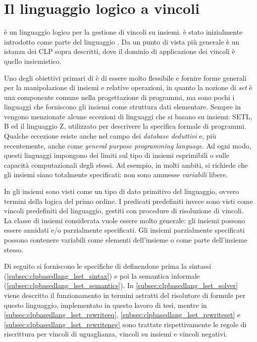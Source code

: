\documentclass[12pt,a4paper,openright]{book}  %
\begin{document}
\section{Il linguaggio logico a vincoli \lset{}}
\label{sec:clpbasedlang_lset}

\lset{} è un linguaggio logico per la gestione di vincoli su
insiemi. \lset{} è stato inizialmente introdotto come parte del
linguaggio \clpset{} \cite{Dovier00}. Da un punto di vista più
generale \clpset{} è un istanza dei CLP sopra descritti, dove il
dominio di applicazione dei vincoli è quello insiemistico.

Uno degli obiettivi primari di \clpset{} è di essere molto flessibile
e fornire forme generali per la manipolazione di insiemi e relative
operazioni, in quanto la nozione di \emph{set} è una componente comune
nella progettazione di programmi, ma sono pochi i linguaggi che
forniscono gli insiemi come struttura dati elementare.  Sempre in
\cite{Dovier00} vengono menzionate alcune eccezioni di linguaggi che
si basano su insiemi: SETL, B ed il linguaggio Z, utilizzato per
descrivere la specifica formale di programmi. Qualche eccezione esiste
anche nel campo dei \emph{database deduttivi} e, più recentemente,
anche come \emph{general purpose programming language}. Ad ogni modo,
questi linguaggi impongono dei limiti sul tipo di insiemi esprimibili
o sulle capacità computazionali degli stessi. Ad esempio, in molti
ambiti, si richiede che gli insiemi siano totalmente specificati: non
sono ammesse \emph{variabili} libere.

In \lset{} gli insiemi sono visti come un tipo di dato primitivo del
linguaggio, ovvero termini della logica del primo ordine. I predicati
predefiniti invece sono visti come vincoli predefiniti del linguaggio,
gestiti con procedure di risoluzione di vincoli. La classe di insiemi
considerata vuole essere molto generale: gli insiemi possono essere
annidati e/o parzialmente specificati. Gli insiemi parzialmente
specificati possono contenere variabili come elementi dell’insieme o
come parte dell’insieme stesso.

Di seguito si forniscono le specifiche di \lset{} definendone prima la
sintassi (\ref{subsec:clpbasedlang_lset_sintax}) e poi la semantica
informale (\ref{subsec:clpbasedlang_lset_semantics}). In
\ref{subsec:clpbasedlang_lset_solver} viene descritto il funzionamento
in termini astratti del risolutore di formule per questo linguaggio,
implementato in questo lavoro di tesi, mentre in
\ref{subsec:clpbasedlang_lset_rewriteeq},
\ref{subsec:clpbasedlang_lset_rewriteset} e
\ref{subsec:clpbasedlang_lset_rewriteneg} sono trattate
rispettivamente le regole di riscrittura per vincoli di uguaglianza,
vincoli su insiemi e vincoli negativi.
\end{document}
